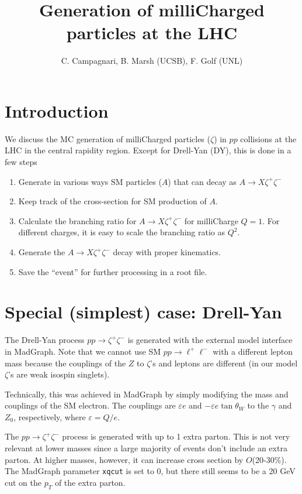 \documentclass[12pt]{article}
\title{Generation of milliCharged particles at the LHC}
\author{C. Campagnari, B. Marsh (UCSB), F. Golf (UNL)}
\begin{document}
\maketitle


\section{Introduction}
We discuss the MC generation of milliCharged
particles ($\zeta$) in $pp$ collisions at the LHC in the central rapidity
region. 
Except for Drell-Yan (DY), this is done in a few steps
\begin{enumerate}
\item Generate in various ways SM particles ($A$) that can decay as
  $A \to X \zeta^+ \zeta^-$
\item Keep track of the cross-section for SM production of $A$.
\item Calculate the branching ratio for $A \to X \zeta^+ \zeta^-$
  for milliCharge $Q=1$.  For different charges, it is easy to
  scale the branching ratio as $Q^2$.
\item Generate the $A \to X \zeta^+ \zeta^-$ decay with proper
  kinematics.
\item Save the ``event'' for further processing in a root file.
  \end{enumerate}
  


\section{Special (simplest) case: Drell-Yan}
The Drell-Yan process $pp \to \zeta^+ \zeta^-$ is generated with
the external model interface in MadGraph.  Note that we cannot use
SM $pp \to \ell^+ \ell^-$ with a different lepton mass
because the couplings of the $Z$ to
$\zeta$'s and leptons are different
(in our model $\zeta$'s are weak isospin
singlets\cite{Holdom}\cite{Haas:2014dda}).

Technically, this was achieved in MadGraph by simply modifying the mass and couplings
of the SM electron. The couplings are $\varepsilon e$ and $-\varepsilon e\tan\theta_W$ to
the $\gamma$ and $Z_0$, respectively, where $\varepsilon = Q/e$.

The $pp\to\zeta^+\zeta^-$ process is generated with up to 1 extra parton. This is not very 
relevant at lower masses since a large majority of events don't include an extra parton. At 
higher masses, however, it can increase cross section by $O$(20-30\%). The MadGraph
parameter \texttt{xqcut} is set to 0, but there still seems to be a 20 GeV cut on the $p_T$
of the extra parton.
\end{document}
